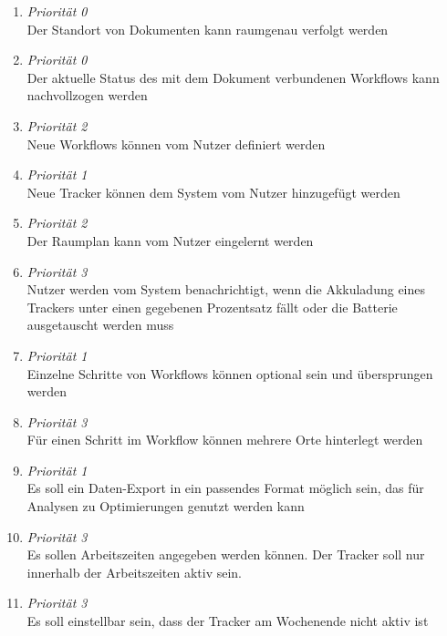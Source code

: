 \begin{enumerate}[label=\textbf{F-\arabic*}]
	\item \label{fa:tracking} \textit{Priorität 0} \\
		Der Standort von Dokumenten kann raumgenau verfolgt werden
	\item \label{fa:workflow} \textit{Priorität 0} \\
		Der aktuelle Status des mit dem Dokument verbundenen Workflows kann nachvollzogen werden
	\item \label{fa:neue-workflows} \textit{Priorität 2} \\
		Neue Workflows können vom Nutzer definiert werden
	\item \label{fa:neue-tracker} \textit{Priorität 1} \\
		Neue Tracker können dem System vom Nutzer hinzugefügt werden
	\item \label{fa:raumplan} \textit{Priorität 2} \\
		Der Raumplan kann vom Nutzer eingelernt werden
	\item \label{fa:benachrichtigung} \textit{Priorität 3} \\
		Nutzer werden vom System benachrichtigt, wenn die Akkuladung eines Trackers unter einen
		gegebenen Prozentsatz fällt oder die Batterie ausgetauscht werden muss
	\item \label{fa:optionale-schritte} \textit{Priorität 1}  \\
		Einzelne Schritte von Workflows können optional sein und übersprungen werden
	\item \label{fa:mehrere-orte} \textit{Priorität 3} \\
		Für einen Schritt im Workflow können mehrere Orte hinterlegt werden
	\item \label{fa:export} \textit{Priorität 1} \\
		Es soll ein Daten-Export in ein passendes Format möglich sein, das für Analysen
	  zu Optimierungen genutzt werden kann
	\item \label{fa:arbeitszeiten} \textit{Priorität 3} \\
		Es sollen Arbeitszeiten angegeben werden können.  Der Tracker soll nur innerhalb der
		Arbeitszeiten aktiv sein.
	\item \label{fa:wochenende} \textit{Priorität 3} \\
		Es soll einstellbar sein, dass der Tracker am Wochenende nicht aktiv ist
\end{enumerate}

